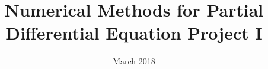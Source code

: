 \documentclass[11pt,a4paper]{article} %
\numberwithin{equation}{section}
\begin{document}
    \title{Numerical Methods for Partial Differential Equation \quad Project I}
        \titleformat{\section}{\bfseries\Large}{\thesection\quad}{0em}{}  %
    \author{}

    \date{March 2018}
    \maketitle

    

\section{}

\section{}




% 
% 
\end{document}
